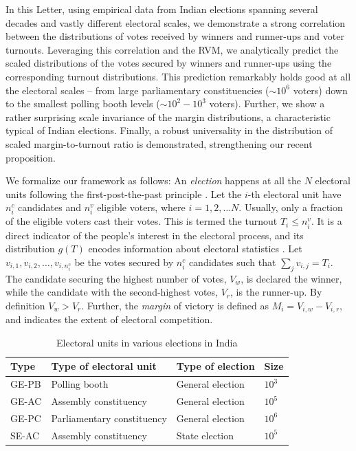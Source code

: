 \documentclass[reprint, pre, twocolumn, aps, showpacs, superscriptaddress]{revtex4-2}
\begin{document}
In this Letter, using empirical data from Indian elections \cite{india_data, lokdhaba} spanning several decades and vastly different electoral scales, we demonstrate a strong correlation between the distributions of votes received by winners and runner-ups and voter turnouts. Leveraging this correlation and the RVM, we analytically predict the scaled distributions of the votes secured by winners and runner-ups using the corresponding turnout distributions. This prediction remarkably holds good at all the electoral scales -- from large parliamentary constituencies ($ \sim 10^6$ voters) down to the smallest polling booth levels ($\sim 10^2-10^3$ voters). Further, we show a rather surprising scale invariance of the margin distributions, a characteristic typical of Indian elections. Finally, a robust universality in the distribution of scaled margin-to-turnout ratio is demonstrated, strengthening our recent proposition.

We formalize our framework as follows: An {\it election} happens at all the $N$ electoral units following the first-post-the-past principle \cite{johnston2007politics}. Let the $i$-th electoral unit have $n^c_i$ candidates and $n^v_i$ eligible voters, where $i=1,2, \dots N$. Usually, only a fraction of the eligible voters cast their votes. This is termed the turnout $T_i \le n^v_i$. It is a direct indicator of the people's interest in the electoral process, and its distribution $g(T)$ encodes information about electoral statistics \cite{pal2024universal}. Let $v_{i,1}, v_{i,2}, \dots, v_{i,n^c_i}$ be the votes secured by $n^c_i$ candidates such that $\sum_j v_{i,j}=T_i$. The candidate securing the highest number of votes, $V_{w}$, is declared the winner, while the candidate with the second-highest votes, $V_{r}$, is the runner-up. By definition $V_w > V_r$. Further, the \emph{margin} of victory is defined as $M_i = V_{i, w} - V_{i, r}$, and indicates the extent of electoral competition.
\begin{table}[b]
\caption{\label{tab:example}Electoral units in various elections in India}
\begin{ruledtabular}
\begin{tabular}{llll}
Type & Type of electoral unit & Type of election & Size \\
\hline
GE-PB & Polling booth & General election  &  $10^3$ \\
GE-AC & Assembly constituency & General election  &  $10^5$ \\
GE-PC & Parliamentary constituency & General election  &  $10^6$ \\
SE-AC & Assembly constituency & State election  &  $10^5$ \\
\end{tabular}
\end{ruledtabular}
\label{table1}
\end{table}
\end{document}
